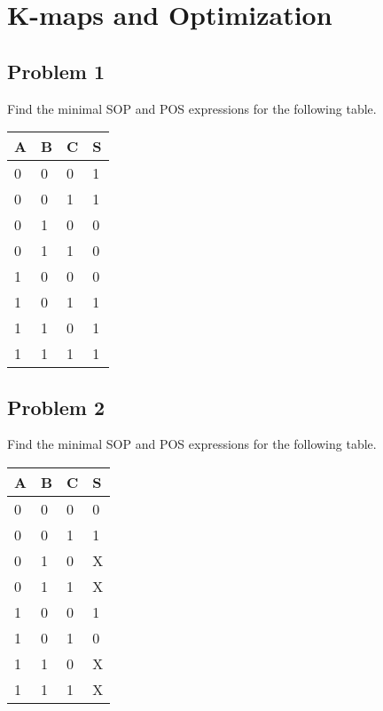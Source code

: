 \documentclass{article}
\begin{document}
\newpage
\section*{K-maps and Optimization} %
\subsection*{Problem 1}
Find the minimal SOP and POS expressions for the following table.
\begin{table}[!h]
\begin{tabular}{|l|l|l|l|}
\hline
A & B & C & S \\ \hline
0 & 0 & 0 & 1 \\ \hline
0 & 0 & 1 & 1 \\ \hline
0 & 1 & 0 & 0 \\ \hline
0 & 1 & 1 & 0 \\ \hline
1 & 0 & 0 & 0 \\ \hline
1 & 0 & 1 & 1 \\ \hline
1 & 1 & 0 & 1 \\ \hline
1 & 1 & 1 & 1 \\ \hline
\end{tabular}
\end{table}

\subsection*{Problem 2}
Find the minimal SOP and POS expressions for the following table.
\begin{table}[!h]
\begin{tabular}{|l|l|l|l|}
\hline
A & B & C & S \\ \hline
0 & 0 & 0 & 0 \\ \hline
0 & 0 & 1 & 1 \\ \hline
0 & 1 & 0 & X \\ \hline
0 & 1 & 1 & X \\ \hline
1 & 0 & 0 & 1 \\ \hline
1 & 0 & 1 & 0 \\ \hline
1 & 1 & 0 & X \\ \hline
1 & 1 & 1 & X \\ \hline
\end{tabular}
\end{table}

\newpage
\end{document}
